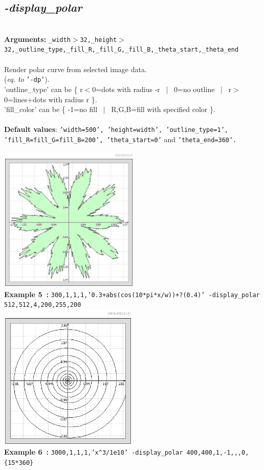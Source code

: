 \documentclass[a4paper,11pt,twoside]{book}
\begin{document}
\subsection{\emph{-display\_polar} }\vspace*{-0.5em}
~\\\textbf{Arguments: } 
{\small \texttt{\_width$>$32,\_height$>$32,\_outline\_type,\_fill\_R,\_fill\_G,\_fill\_B,\_theta\_start,\_theta\_end}}\\~\\
Render polar curve from selected image data.
~\\(\emph{eq. to} {\small \texttt{'-dp'}}).
~\\'outline\_type' can be \{ r$<$0=dots with radius -r ~$|$~ 0=no outline ~$|$~ r$>$0=lines+dots with radius r \}.
~\\'fill\_color' can be \{ -1=no fill ~$|$~ R,G,B=fill with specified color \}.
~\\~\\\textbf{Default values}: {\small \texttt{'width=500', 'height=width', 'outline\_type=1', 'fill\_R=fill\_G=fill\_B=200', 'theta\_start=0'} and \texttt{'theta\_end=360'.}}
\begin{center}\includegraphics[keepaspectratio=true,height=7cm,width=\textwidth]{img/gmic_def5.jpg}\\
{\footnotesize \textbf{Example 5~:} \texttt{300,1,1,1,'0.3+abs(cos(10*pi*x/w))+?(0.4)' -display\_polar 512,512,4,200,255,200}}
\\\includegraphics[keepaspectratio=true,height=7cm,width=\textwidth]{img/gmic_def6.jpg}\\
{\footnotesize \textbf{Example 6~:} \texttt{3000,1,1,1,'x\textasciicircum 3/1e10' -display\_polar 400,400,1,-1,,,0,\{15*360\}}}
\end{center}
\end{document}
